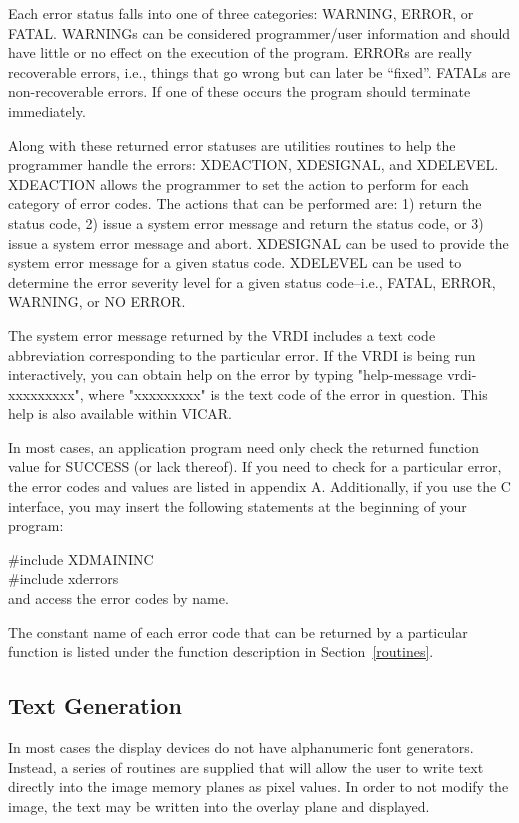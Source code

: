 Each error status falls into one of three categories:  WARNING,
ERROR, or FATAL.  WARNINGs can be considered programmer/user
information and should have little or no effect on the execution of
the program.  ERRORs are really recoverable errors, i.e., things
that go wrong but can later be ``fixed''.  FATALs are non-recoverable
errors.  If one of these occurs the program should terminate
immediately.

Along with these returned error statuses are utilities routines to
help the programmer handle the errors:  XDEACTION,
XDESIGNAL, and XDELEVEL.  XDEACTION allows the programmer to set
the action to perform for each category of error codes.  The actions
that can be performed are:  1) return the status code, 2) issue a
system error message and return the status code, or 3) issue a system
error message and abort.  XDESIGNAL can be used to provide the system
error message for a given status code.  XDELEVEL can be used to
determine the error severity level for a given status code--i.e.,
FATAL, ERROR, WARNING, or NO ERROR.

The system error message returned by the VRDI includes a text code
abbreviation corresponding to the particular error.  If the VRDI is
being run interactively, you can obtain help on the error by typing
"help-message vrdi-xxxxxxxxx", where "xxxxxxxxx" is the text code
of the error in question.  This help is also available within VICAR.

In most cases, an application program need only check the returned
function value for SUCCESS (or lack thereof).  If you need to check
for a particular error, the error codes and values are listed in
appendix A.  Additionally, if you use the C interface, you may
insert the following statements at the beginning of your program:

\#include XDMAININC\\
\#include xderrors\\

and access the error codes by name.

The constant name of each error code that can be returned by a
particular function is listed under the function description in
Section~\ref{routines}.
\subsection{Text Generation}
In most cases the display devices do not have alphanumeric font
generators.  Instead, a series of routines
are supplied that will allow the user to write text directly into the
image memory planes as pixel values.  In order to not modify the image,
the text may be written into the overlay plane and displayed.

